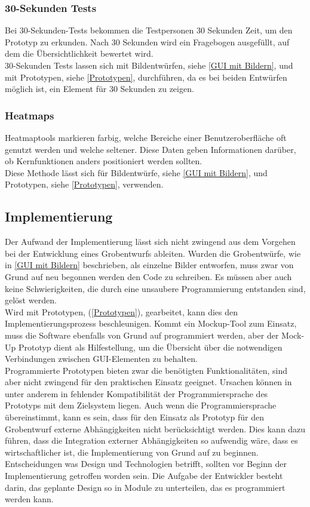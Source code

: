 \subsubsection{30-Sekunden Tests}
\label{30-Sekunden Tests}
Bei 30-Sekunden-Tests bekommen die Testpersonen 30 Sekunden Zeit, um den Prototyp zu erkunden. Nach 30 Sekunden wird ein Fragebogen ausgefüllt, auf dem die Übersichtlichkeit bewertet wird\cite{vsimek2015usability}. \\
30-Sekunden Tests lassen sich mit Bildentwürfen, siehe \ref{GUI mit Bildern}, und mit Prototypen, siehe  \ref{Prototypen}, durchführen, da es bei beiden Entwürfen möglich ist, ein Element für 30 Sekunden zu zeigen.
\subsubsection{Heatmaps}
\label{Heatmaps}
Heatmaptools markieren farbig, welche Bereiche einer Benutzeroberfläche oft genutzt werden und welche seltener\cite{10.1145/2470654.2466442}. Diese Daten geben Informationen darüber, ob Kernfunktionen anders positioniert werden sollten.\\
Diese Methode lässt sich für Bildentwürfe, siehe \ref{GUI mit Bildern}, und Prototypen, siehe \ref{Prototypen}, verwenden.

\subsection{Implementierung}
Der Aufwand der Implementierung lässt sich nicht zwingend aus dem Vorgehen bei der Entwicklung eines Grobentwurfs ableiten. Wurden die Grobentwürfe, wie in \ref{GUI mit Bildern} beschrieben, als einzelne Bilder entworfen, muss zwar von Grund auf neu begonnen werden den Code zu schreiben. Es müssen aber auch keine Schwierigkeiten, die durch eine unsaubere Programmierung entstanden sind, gelöst werden. \\
Wird mit Prototypen, (\ref{Prototypen}), gearbeitet, kann dies den Implementierungsprozess beschleunigen. Kommt ein Mockup-Tool zum Einsatz, muss die Software ebenfalls von Grund auf programmiert werden, aber der Mock-Up Prototyp dient als Hilfestellung, um die Übersicht über die notwendigen Verbindungen zwischen \ac{GUI}-Elementen zu behalten.\\
Programmierte Prototypen bieten zwar die benötigten Funktionalitäten, sind aber nicht zwingend für den praktischen Einsatz geeignet. Ursachen können in unter anderem in fehlender Kompatibilität der Programmiersprache des Prototyps mit dem Zielsystem liegen. Auch wenn die Programmiersprache übereinstimmt, kann es sein, dass für den Einsatz als Prototyp für den Grobentwurf externe Abhängigkeiten nicht berücksichtigt werden. Dies kann dazu führen, dass die Integration externer Abhängigkeiten so aufwendig wäre, dass es wirtschaftlicher ist, die Implementierung von Grund auf zu beginnen.\\
Entscheidungen was Design und Technologien betrifft, sollten vor Beginn der Implementierung getroffen worden sein. Die Aufgabe der Entwickler besteht darin, das geplante Design so in Module zu unterteilen, das es programmiert werden kann\cite{rakos1990software}. 

